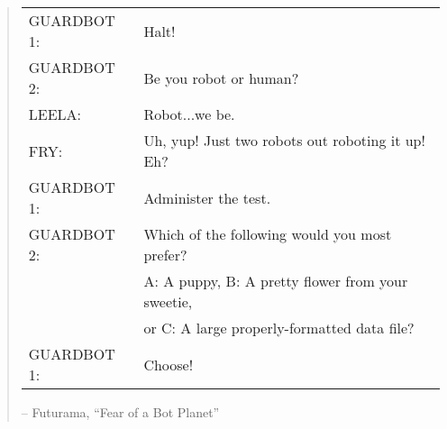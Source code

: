 \vspace{0.5cm}
\begin{quote}
{\it
\begin{tabular}{ll}
GUARDBOT 1:& Halt! \\
GUARDBOT 2:& Be you robot or human? \\
LEELA:& Robot...we be. \\
FRY:& Uh, yup! Just two robots out roboting it up!  Eh? \\
GUARDBOT 1:& Administer the test. \\
GUARDBOT 2:& Which of the following would you most prefer? \\
& A: A puppy, B: A pretty flower from your sweetie, \\
& or C: A large properly-formatted data file? \\
GUARDBOT 1:& Choose! \\
\end{tabular}
} 

\hspace*{2cm} -- Futurama, ``Fear of a Bot Planet''
\end{quote}

